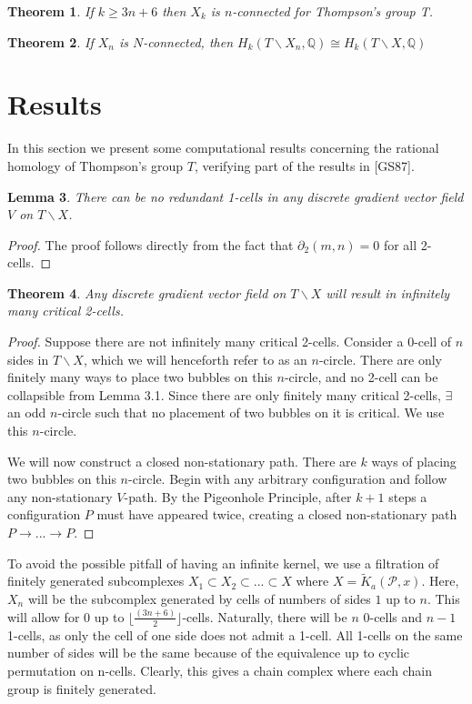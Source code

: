 \documentclass{amsart}
\newtheorem{theorem}{Theorem}[section]
\newtheorem{lemma}[theorem]{Lemma}
\newcommand{\bq}{\ensuremath{\mathbb{Q}}} %
\begin{document}
\begin{theorem}
	If $k \geq 3n+6$ then $X_{k}$ is $n$-connected for Thompson's group T.
\end{theorem}
\begin{theorem}
	If $X_{n}$ is $N$-connected, then $H_{k}(T\backslash X_{n}, \bq) \cong H_{k}(T\backslash X, \bq)$
\end{theorem}

\section{Results}
In this section we present some computational results concerning the rational homology of Thompson's group $T$, verifying part of the results in [GS87]. 

\begin{lemma}
	There can be no redundant 1-cells in any discrete gradient vector field $V$ on $T \backslash X$.
\end{lemma}
\begin{proof}
	The proof follows directly from the fact that $\partial_{2}(m,n) = 0$ for all 2-cells.
\end{proof}

\begin{theorem}
	Any discrete gradient vector field on $T\backslash X$ will result in infinitely many critical 2-cells.
\end{theorem}
	\begin{proof}
		Suppose there are not infinitely many critical 2-cells. Consider a 0-cell of $n$ sides in $T \backslash X$, which we will henceforth refer to as an $n$-circle. There are only finitely many ways to place two bubbles on this $n$-circle, and no 2-cell can be collapsible from Lemma 3.1. Since there are only finitely many critical 2-cells, $\exists$ an odd $n$-circle such that no placement of two bubbles on it is critical. We use this $n$-circle. 
		
		We will now construct a closed non-stationary path. There are $k$ ways of placing two bubbles on this $n$-circle. Begin with any arbitrary configuration and follow any non-stationary $V$-path. By the Pigeonhole Principle, after $k+1$ steps a configuration $P$ must have appeared twice, creating a closed non-stationary path $P \to ... \to P$. 
	\end{proof}

To avoid the possible pitfall of having an infinite kernel, we use a filtration of finitely generated subcomplexes $X_{1} \subset X_{2} \subset ... \subset X$ where $X = \widetilde{K}_{a}(\mathcal{P}, x)$. Here, $X_{n}$ will be the subcomplex generated by cells of numbers of sides $1$ up to $n$. This will allow for $0$ up to $\lfloor \frac{(3n+6)}{2} \rfloor$-cells. Naturally, there will be $n$ 0-cells and $n-1$ 1-cells, as only the cell of one side does not admit a 1-cell. All 1-cells on the same number of sides will be the same because of the equivalence up to cyclic permutation on n-cells. Clearly, this gives a chain complex where each chain group is finitely generated.
\end{document}
